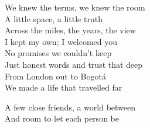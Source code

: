 \begin{lyrics}
We knew the terms, we knew the room\\
A little space, a little truth\\
Across the miles, the years, the view\\
I kept my own; I welcomed you\\
No promises we couldn’t keep\\
Just honest words and trust that deep\\
From London out to Bogotá\\
We made a life that travelled far

A few close friends, a world between\\
And room to let each person be
\end{lyrics}
